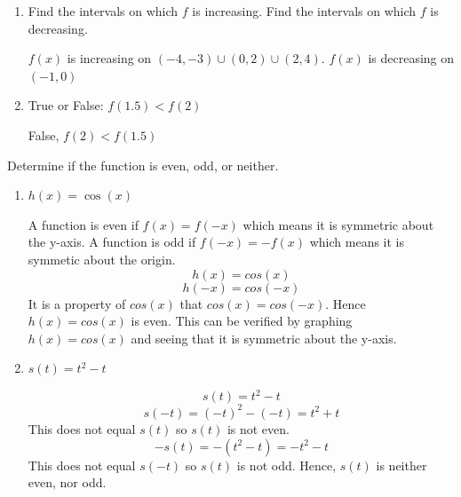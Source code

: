 \documentclass[handout]{ximera}
\begin{document}
\begin{problem}
\begin{enumerate}
	\item Find the intervals on which $f$ is increasing.  Find the intervals on which $f$ is decreasing.
		\begin{freeResponse}
		$f(x)$ is increasing on $(-4,-3)\cup(0,2)\cup(2,4)$.  $f(x)$ is decreasing on $(-1,0)$
		\end{freeResponse}
	
	\item True or False: $f(1.5) < f(2)$
		\begin{freeResponse}
		False, $f(2) < f(1.5)$
		\end{freeResponse}	
	
	\end{enumerate}

	
\end{problem}

\begin{instructorNotes}

\end{instructorNotes}

\begin{problem}
Determine if the function is even, odd, or neither.


\begin{enumerate}	
	\item  $h(x)=\cos(x)$
		\begin{freeResponse}

		A function is even if $f(x)=f(-x)$ which means it is symmetric about the y-axis.  A function is odd if $f(-x)=-f(x)$ which means it is symmetic about the origin. 
		 $$h(x)=cos(x)$$
			$$h(-x)=cos(-x)$$
			It is a property of $cos(x)$ that $cos(x)=cos(-x)$.  Hence $h(x)=cos(x)$ is even.  This can be verified by graphing $h(x)=cos(x)$ and seeing that it is symmetric about the y-axis.
		\end{freeResponse}

	\item  $s(t)=t^2-t$
		\begin{freeResponse}
			$$s(t)=t^2-t$$
			$$s(-t)=(-t)^2-(-t)=t^2+t$$ This does not equal $s(t)$ so $s(t)$ is not even.
			$$-s(t)=-(t^2-t)=-t^2-t$$  This does not equal $s(-t)$ so $s(t)$ is not odd.  Hence, $s(t)$ is neither even, nor odd.
		\end{freeResponse}
	\end{enumerate}
	
	
\end{problem}

\begin{instructorNotes}

\end{instructorNotes}
\end{document}
